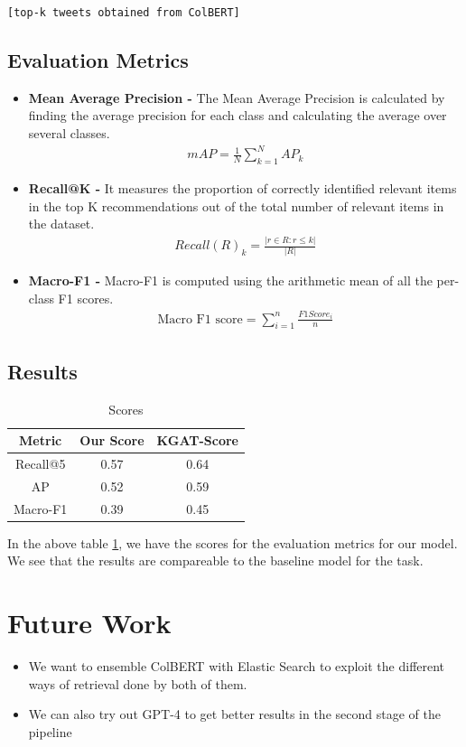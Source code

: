 \documentclass[conference]{IEEEtran}
\begin{document}
\texttt{[top-k tweets obtained from ColBERT]}

\subsection{Evaluation Metrics}
\begin{itemize}
    \item \textbf{Mean Average Precision - }The Mean Average Precision is calculated by finding the average precision for each class and calculating the average over several classes.
    \begin{align}
        mAP = \frac{1}{N} \sum_{k=1}^{N} AP_k
    \end{align}
    \item \textbf{Recall@K - }It measures the proportion of correctly identified relevant items in the top K recommendations out of the total number of relevant items in the dataset.
    \begin{align}
        Recall(R)_k = \frac{|{r\in R: r \le k}|}{|R|} 
    \end{align}
    \item \textbf{Macro-F1 - }Macro-F1 is computed using the arithmetic mean of all the per-class F1 scores. 
    \begin{align}
        \text{Macro F1 score} = \sum_{i=1}^{n} \frac{F1 Score_i}{n}
    \end{align}
\end{itemize}


\subsection{Results}
\begin{table}[h]
  \centering
  \begin{tabular}{|c|c|c|}
    \hline
    Metric & Our Score & KGAT-Score \\ \hline
    Recall@5  & 0.57 & 0.64 \\
    AP  & 0.52  & 0.59\\
    Macro-F1  & 0.39 & 0.45  \\
    \hline
\end{tabular}
\label{tab:results}
\caption{Scores}
\end{table}
In the above table \ref{tab:results}, we have the scores for the evaluation metrics for our model. We see that the results are compareable to the baseline model \cite{kgat} for the task. 


\section{Future Work}
\begin{itemize}
    \item We want to ensemble ColBERT with Elastic Search to exploit the different ways of retrieval done by both of them.
    \item We can also try out GPT-4 to get better results in the second stage of the pipeline
\end{itemize}
\end{document}
